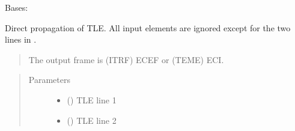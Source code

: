 \documentclass[letterpaper,10pt,english]{sphinxmanual}
\begin{document}

\begin{fulllineitems}
\label{\detokenize{modules/propagator_sgp4:propagator_sgp4.PropagatorTLE}}
Bases: {\hyperref[\detokenize{modules/propagator_sgp4:propagator_sgp4.PropagatorSGP4}]{}}

\begin{fulllineitems}
\label{\detokenize{modules/propagator_sgp4:propagator_sgp4.PropagatorTLE.get_orbit}}

Direct propagation of TLE. All input elements are ignored except for the two lines in .

\begin{quote}

The output frame is (ITRF) ECEF or (TEME) ECI.
\end{quote}
\begin{quote}\begin{description}
\item[{Parameters}] \leavevmode\begin{itemize}
\item {} 
 () \textendash{} TLE line 1

\item {} 
 () \textendash{} TLE line 2

\end{itemize}

\end{description}\end{quote}

\end{fulllineitems}



\end{fulllineitems}
\end{document}
